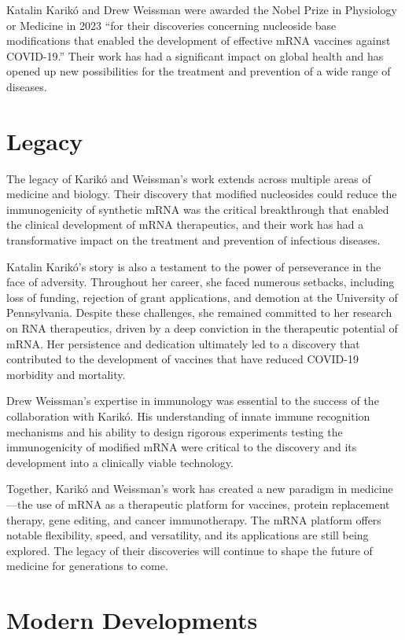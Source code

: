 Katalin Karik\'o and Drew Weissman were awarded the Nobel Prize in Physiology or Medicine in 2023 ``for their discoveries concerning nucleoside base modifications that enabled the development of effective mRNA vaccines against COVID-19.'' Their work has had a significant impact on global health and has opened up new possibilities for the treatment and prevention of a wide range of diseases.

\section{Legacy}

The legacy of Karik\'o and Weissman's work extends across multiple areas of medicine and biology. Their discovery that modified nucleosides could reduce the immunogenicity of synthetic mRNA was the critical breakthrough that enabled the clinical development of mRNA therapeutics, and their work has had a transformative impact on the treatment and prevention of infectious diseases.

Katalin Karik\'o's story is also a testament to the power of perseverance in the face of adversity. Throughout her career, she faced numerous setbacks, including loss of funding, rejection of grant applications, and demotion at the University of Pennsylvania. Despite these challenges, she remained committed to her research on RNA therapeutics, driven by a deep conviction in the therapeutic potential of mRNA. Her persistence and dedication ultimately led to a discovery that contributed to the development of vaccines that have reduced COVID-19 morbidity and mortality.

Drew Weissman's expertise in immunology was essential to the success of the collaboration with Karik\'o. His understanding of innate immune recognition mechanisms and his ability to design rigorous experiments testing the immunogenicity of modified mRNA were critical to the discovery and its development into a clinically viable technology.

Together, Karik\'o and Weissman's work has created a new paradigm in medicine---the use of mRNA as a therapeutic platform for vaccines, protein replacement therapy, gene editing, and cancer immunotherapy. The mRNA platform offers notable flexibility, speed, and versatility, and its applications are still being explored. The legacy of their discoveries will continue to shape the future of medicine for generations to come.


\section{Modern Developments}

